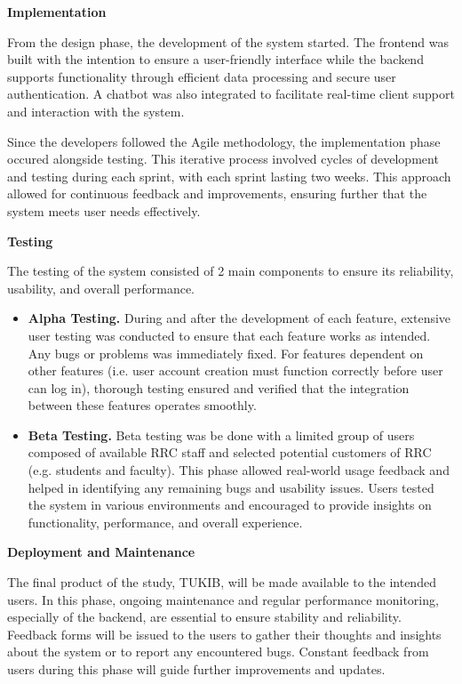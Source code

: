 \textbf{Implementation}

From the design phase, the development of the system started. The frontend was built with the intention to ensure a user-friendly interface while the backend supports functionality through efficient data processing and secure user authentication. A chatbot was also integrated to facilitate real-time client support and interaction with the system.

Since the developers followed the Agile methodology, the implementation phase occured alongside testing. This iterative process involved cycles of development and testing during each sprint, with each sprint lasting two weeks. This approach allowed for continuous feedback and improvements, ensuring further that the system meets user needs effectively.\newline

\textbf{Testing}

The testing of the system consisted of 2 main components to ensure its reliability, usability, and overall performance.

\begin{itemize}
	\item \textbf{Alpha Testing.} During and after the development of each feature, extensive user testing was conducted to ensure that each feature works as intended. Any bugs or problems was immediately fixed. For features dependent on other features (i.e. user account creation must function correctly before user can log in), thorough testing ensured and verified that the integration between these features operates smoothly.
	
	\item \textbf{Beta Testing.}  Beta testing was be done with a limited group of users composed of available RRC staff and selected potential customers of RRC (e.g. students and faculty). This phase allowed real-world usage feedback and helped in identifying any remaining bugs and usability issues. Users tested the system in various environments and encouraged to provide insights on functionality, performance, and overall experience.\newline
\end{itemize}

\textbf{Deployment and Maintenance}

The final product of the study, TUKIB, will be made available to the intended users. In this phase, ongoing maintenance and regular performance monitoring, especially of the backend, are essential to ensure stability and reliability. Feedback forms will be issued to the users to gather their thoughts and insights about the system or to report any encountered bugs. Constant feedback from users during this phase will guide further improvements and updates.

